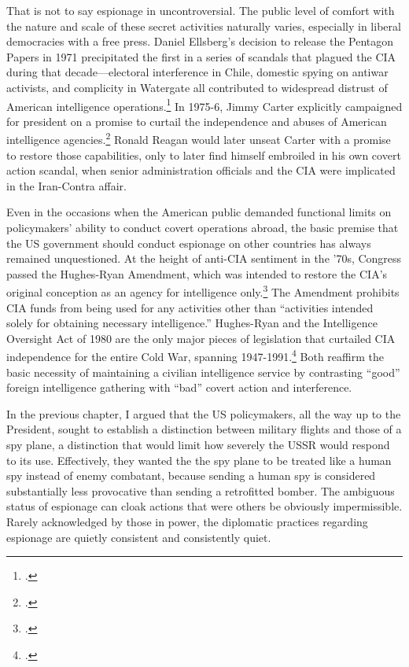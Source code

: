 \documentclass{memoir}
\begin{document}
\begin{refsegment}
That is not to say espionage in uncontroversial. The public level of comfort with the nature and scale of these secret activities naturally varies, especially in liberal democracies with a free press. Daniel Ellsberg's decision to release the Pentagon Papers in 1971 precipitated the first in a series of scandals that plagued the CIA during that decade---electoral interference in Chile, domestic spying on antiwar activists, and complicity in Watergate all contributed to widespread distrust of American intelligence operations.\footcite[p.~214-215]{andrew_missing_1984} In 1975-6, Jimmy Carter explicitly campaigned for president on a promise to curtail the independence and abuses of American intelligence agencies.\footcite[p.~217]{andrew_missing_1984} Ronald Reagan would later unseat Carter with a promise to restore those capabilities, only to later find himself embroiled in his own covert action scandal, when senior administration officials and the CIA were implicated in the Iran-Contra affair.

Even in the occasions when the American public demanded functional limits on policymakers' ability to conduct covert operations abroad, the basic premise that the US government should conduct espionage on other countries has always remained unquestioned. At the height of anti-CIA sentiment in the '70s, Congress passed the Hughes-Ryan Amendment, which was intended to restore the CIA's original conception as an agency for intelligence only.\footcite[p.~215]{andrew_missing_1984} The Amendment prohibits CIA funds from being used for any activities other than ``activities intended solely for obtaining necessary intelligence.'' Hughes-Ryan and the Intelligence Oversight Act of 1980 are the only major pieces of legislation that curtailed CIA independence for the entire Cold War, spanning 1947-1991.\footcite[p.~93-94]{cogan_covert_1993} Both reaffirm the basic necessity of maintaining a civilian intelligence service by contrasting ``good'' foreign intelligence gathering with ``bad'' covert action and interference.

In the previous chapter, I argued that the US policymakers, all the way up to the President, sought to establish a distinction between military flights and those of a spy plane, a distinction that would limit how severely the USSR would respond to its use. Effectively, they wanted the the spy plane to be treated like a human spy instead of enemy combatant, because sending a human spy is considered substantially less provocative than sending a retrofitted bomber. The ambiguous status of espionage can cloak actions that were others be obviously impermissible. Rarely acknowledged by those in power, the diplomatic practices regarding espionage are quietly consistent and consistently quiet.


\end{refsegment}
\end{document}
